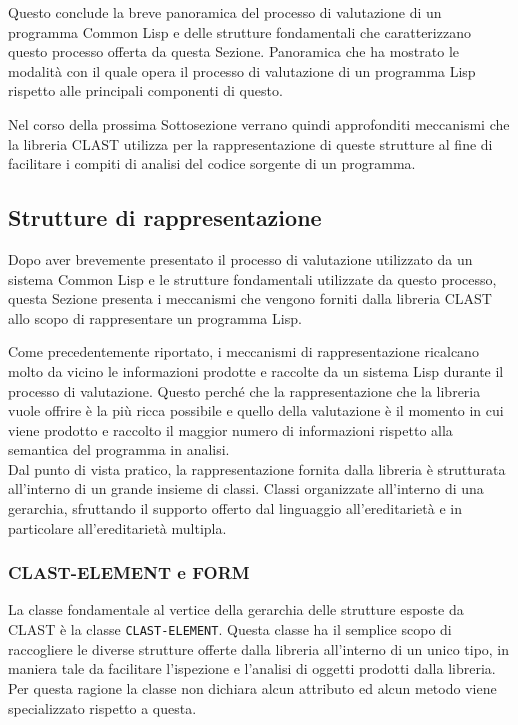 Questo conclude la breve panoramica del processo di valutazione di un
programma Common Lisp e delle strutture fondamentali che caratterizzano questo
processo offerta da questa Sezione. Panoramica che ha mostrato le modalità con
il quale opera il processo di valutazione di un programma Lisp rispetto alle
principali componenti di questo.

Nel corso della prossima Sottosezione verrano quindi approfonditi meccanismi che
la libreria CLAST utilizza per la rappresentazione di queste strutture al fine
di facilitare i compiti di analisi del codice sorgente di un programma.

\subsection{Strutture di rappresentazione}

Dopo aver brevemente presentato il processo di valutazione utilizzato da un
sistema Common Lisp e le strutture fondamentali utilizzate da questo processo,
questa Sezione presenta i meccanismi che vengono forniti dalla libreria CLAST
allo scopo di rappresentare un programma Lisp.

Come precedentemente riportato, i meccanismi di rappresentazione ricalcano
molto da vicino le informazioni prodotte e raccolte da un sistema Lisp durante
il processo di valutazione. Questo perché che la rappresentazione che la
libreria vuole offrire è la più ricca possibile e quello della valutazione è
il momento in cui viene prodotto e raccolto il maggior numero di informazioni
rispetto alla semantica del programma in analisi.\\

Dal punto di vista pratico, la rappresentazione fornita dalla libreria è
strutturata all’interno di un grande insieme di classi. Classi organizzate
all’interno di una gerarchia, sfruttando il supporto offerto dal linguaggio
all’ereditarietà e in particolare all’ereditarietà multipla.

\subsubsection{CLAST-ELEMENT e FORM}

La classe fondamentale al vertice della gerarchia delle strutture esposte da
CLAST è la classe \texttt{CLAST-ELEMENT}. Questa classe ha il semplice scopo
di raccogliere le diverse strutture offerte dalla libreria all'interno di un
unico tipo, in maniera tale da facilitare l’ispezione e l’analisi di oggetti
prodotti dalla libreria. Per questa ragione la classe non dichiara alcun
attributo ed alcun metodo viene specializzato rispetto a questa.\\

